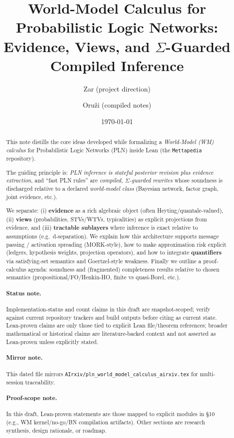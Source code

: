 \documentclass[11pt]{article}
\title{\vspace{-1.5em}
World-Model Calculus for Probabilistic Logic Networks:\\
Evidence, Views, and $\Sigma$-Guarded Compiled Inference
\vspace{-0.5em}}
\author{Zar (project direction) \and Oru\v{z}i (compiled notes)}
\date{\today}
\begin{document}
\maketitle

\begin{abstract}
This note distills the core ideas developed while formalizing a \emph{World-Model (WM) calculus}
for Probabilistic Logic Networks (PLN) inside Lean (the \texttt{Mettapedia} repository).

The guiding principle is: \emph{PLN inference is stateful posterior revision plus evidence extraction},
and ``fast PLN rules'' are \emph{compiled, $\Sigma$-guarded rewrites} whose soundness is discharged
relative to a declared \emph{world-model class} (Bayesian network, factor graph, joint evidence, etc.).

We separate:
(i) \textbf{evidence} as a rich algebraic object (often Heyting/quantale-valued),
(ii) \textbf{views} (probabilities, STVs/WTVs, typicalities) as explicit projections from evidence,
and
(iii) \textbf{tractable sublayers} where inference is exact relative to assumptions (e.g.\ d-separation).
We explain how this architecture supports message passing / activation spreading (MORK-style),
how to make approximation risk explicit (ledgers, hypothesis weights, projection operators),
and how to integrate \textbf{quantifiers} via satisfying-set semantics and Goertzel-style weakness.
Finally we outline a proof-calculus agenda: soundness and (fragmented) completeness results
relative to chosen semantics (propositional/FO/Henkin-HO, finite vs quasi-Borel, etc.).
\paragraph{Status note.} Implementation-status and count claims in this draft are snapshot-scoped; verify against current repository trackers and build outputs before citing as current state. Lean-proven claims are only those tied to explicit Lean file/theorem references; broader mathematical or historical claims are literature-backed context and not asserted as Lean-proven unless explicitly stated.
\paragraph{Mirror note.} This dated file mirrors \texttt{AIrxiv/pln\_world\_model\_calculus\_airxiv.tex} for multi-session traceability.
\paragraph{Proof-scope note.} In this draft, Lean-proven statements are those mapped to explicit modules in \S10 (e.g., WM kernel/no-go/BN compilation artifacts). Other sections are research synthesis, design rationale, or roadmap.
\end{abstract}
\end{document}

